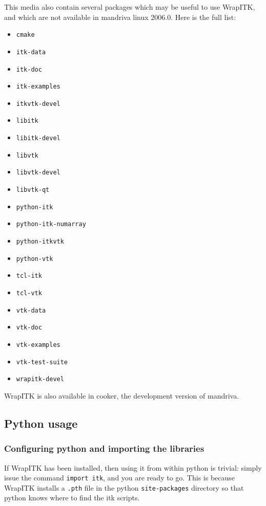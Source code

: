\documentclass{InsightArticle}
\begin{document}
This media also contain several packages which may be useful to use WrapITK,
and which are not available in mandriva linux 2006.0. Here is the full list:
\begin{itemize}
  \item \verb$cmake$
  \item \verb$itk-data$
  \item \verb$itk-doc$
  \item \verb$itk-examples$
  \item \verb$itkvtk-devel$
  \item \verb$libitk$
  \item \verb$libitk-devel$
  \item \verb$libvtk$
  \item \verb$libvtk-devel$
  \item \verb$libvtk-qt$
  \item \verb$python-itk$
  \item \verb$python-itk-numarray$
  \item \verb$python-itkvtk$
  \item \verb$python-vtk$
  \item \verb$tcl-itk$
  \item \verb$tcl-vtk$
  \item \verb$vtk-data$
  \item \verb$vtk-doc$
  \item \verb$vtk-examples$
  \item \verb$vtk-test-suite$
  \item \verb$wrapitk-devel$
\end{itemize}

WrapITK is also available in cooker, the development version of mandriva.


  \subsection{Python usage}

     \subsubsection{Configuring python and importing the libraries}

If WrapITK has been installed, then using it from within python is trivial:
simply issue the command \verb$import itk$, and you are ready to go. This
is because WrapITK installs a \verb$.pth$ file in the python \verb$site-packages$ directory so
that python knows where to find the itk scripts.
\end{document}
